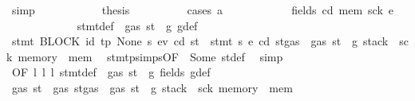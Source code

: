 \begin{isabellebody}
\ simp\isanewline
\ \ \ \ \ \ \ \ \isamarkupfalse%
\ \isamarkupfalse%
\ {\isacharquery}{\kern0pt}thesis\isanewline
\ \ \ \ \ \ \ \ \isamarkupfalse%
\ {\isacharparenleft}{\kern0pt}cases\ a{\isacharparenright}{\kern0pt}\isanewline
\ \ \ \ \ \ \ \ \ \ \isamarkupfalse%
\ {\isacharparenleft}{\kern0pt}fields\ cd{\isacharprime}{\kern0pt}\ mem{\isacharprime}{\kern0pt}\ sck{\isacharprime}{\kern0pt}\ e{\isacharprime}{\kern0pt}{\isacharparenright}{\kern0pt}\isanewline
\ \ \ \ \ \ \ \ \ \ \isamarkupfalse%
\ {}{\isacharparenleft}{\kern0pt}{}{\isacharparenright}{\kern0pt}\ stmt{\isacharunderscore}{\kern0pt}def\ {\isacharbackquoteopen}{\isasymnot}\ gas\ st\ {\isasymle}\ g{\isacharbackquoteclose}\ g{\isacharunderscore}{\kern0pt}def\ \isamarkupfalse%
\ {\isachardoublequoteopen}stmt\ {\isacharparenleft}{\kern0pt}BLOCK\ {\isacharparenleft}{\kern0pt}{\isacharparenleft}{\kern0pt}id{}{\isacharcomma}{\kern0pt}\ tp{\isacharparenright}{\kern0pt}{\isacharcomma}{\kern0pt}\ None{\isacharparenright}{\kern0pt}\ s{\isacharparenright}{\kern0pt}\ e\isactrlsub v\ cd\ st\ {\isacharequal}{\kern0pt}\ stmt\ s\ e{\isacharprime}{\kern0pt}\ cd{\isacharprime}{\kern0pt}\ {\isacharparenleft}{\kern0pt}st{\isasymlparr}gas\ {\isacharcolon}{\kern0pt}{\isacharequal}{\kern0pt}\ gas\ st\ {\isacharminus}{\kern0pt}\ g{\isacharcomma}{\kern0pt}\ stack\ {\isacharcolon}{\kern0pt}{\isacharequal}{\kern0pt}\ sck{\isacharprime}{\kern0pt}{\isacharcomma}{\kern0pt}\ memory\ {\isacharcolon}{\kern0pt}{\isacharequal}{\kern0pt}\ mem{\isacharprime}{\kern0pt}{\isasymrparr}{\isacharparenright}{\kern0pt}{\isachardoublequoteclose}\ \isamarkupfalse%
\ stmt{\isachardot}{\kern0pt}psimps{\isacharparenleft}{\kern0pt}{}{\isacharparenright}{\kern0pt}{\isacharbrackleft}{\kern0pt}OF\ {}{\isacharparenleft}{\kern0pt}{}{\isacharparenright}{\kern0pt}{\isacharbrackright}{\kern0pt}\ Some\ st{\isacharprime}{\kern0pt}{\isacharunderscore}{\kern0pt}def\ \isamarkupfalse%
\ simp\isanewline
\ \ \ \ \ \ \ \ \ \ \isamarkupfalse%
\ {}{\isacharparenleft}{\kern0pt}{}{\isacharparenright}{\kern0pt}{\isacharbrackleft}{\kern0pt}OF\ l{}\ l{}\ l{}{\isacharbrackright}{\kern0pt}\ stmt{\isacharunderscore}{\kern0pt}def\ {\isacharbackquoteopen}{\isasymnot}\ gas\ st\ {\isasymle}\ g{\isacharbackquoteclose}\ fields\ g{\isacharunderscore}{\kern0pt}def\ \isamarkupfalse%
\ {\isachardoublequoteopen}gas\ st{}{\isacharprime}{\kern0pt}\ {\isasymle}\ gas\ {\isacharparenleft}{\kern0pt}st{\isasymlparr}gas\ {\isacharcolon}{\kern0pt}{\isacharequal}{\kern0pt}\ gas\ st\ {\isacharminus}{\kern0pt}\ g{\isacharcomma}{\kern0pt}\ stack\ {\isacharcolon}{\kern0pt}{\isacharequal}{\kern0pt}\ sck{\isacharprime}{\kern0pt}{\isacharcomma}{\kern0pt}\ memory\ {\isacharcolon}{\kern0pt}{\isacharequal}{\kern0pt}\ mem{\isacharprime}{\kern0pt}{\isasymrparr}{\isacharparenright}{\kern0pt}{\isachardoublequoteclose}\ \isamarkupfalse%

\end{isabellebody}
